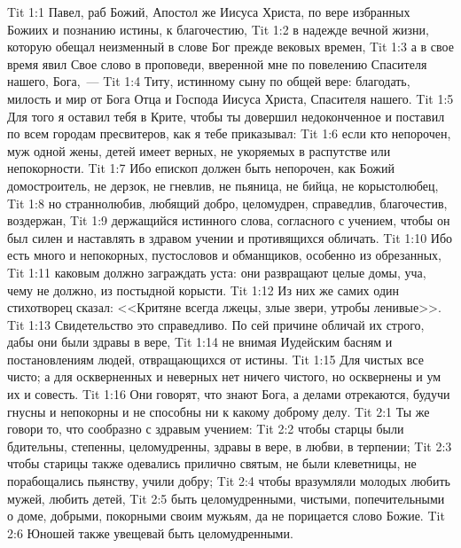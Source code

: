 \vs Tit 1:1 Павел, раб Божий, Апостол же Иисуса Христа, по вере избранных Божиих и познанию истины,  к благочестию,
\vs Tit 1:2 в надежде вечной жизни, которую обещал неизменный в слове Бог прежде вековых времен,
\vs Tit 1:3 а в свое время явил Свое слово в проповеди, вверенной мне по повелению Спасителя нашего, Бога,~---
\vs Tit 1:4 Титу, истинному сыну по общей вере: благодать, милость и мир от Бога Отца и Господа Иисуса Христа, Спасителя нашего.
\rsbpar\vs Tit 1:5 Для того я оставил тебя в Крите, чтобы ты довершил недоконченное и поставил по всем городам пресвитеров, как я тебе приказывал:
\vs Tit 1:6 если кто непорочен, муж одной жены, детей имеет верных, не укоряемых в распутстве или непокорности.
\vs Tit 1:7 Ибо епископ должен быть непорочен, как Божий домостроитель, не дерзок, не гневлив, не пьяница, не бийца, не корыстолюбец,
\vs Tit 1:8 но страннолюбив, любящий добро, целомудрен, справедлив, благочестив, воздержан,
\vs Tit 1:9 держащийся истинного слова, согласного с учением, чтобы он был силен и наставлять в здравом учении и противящихся обличать.
\rsbpar\vs Tit 1:10 Ибо есть много и непокорных, пустословов и обманщиков, особенно из обрезанных,
\vs Tit 1:11 каковым должно заграждать уста: они развращают целые домы, уча, чему не должно, из постыдной корысти.
\vs Tit 1:12 Из них же самих один стихотворец сказал: <<Критяне всегда лжецы, злые звери, утробы ленивые>>.
\vs Tit 1:13 Свидетельство это справедливо. По сей причине обличай их строго, дабы они были здравы в вере,
\vs Tit 1:14 не внимая Иудейским басням и постановлениям людей, отвращающихся от истины.
\vs Tit 1:15 Для чистых все чисто; а для оскверненных и неверных нет ничего чистого, но осквернены и ум их и совесть.
\vs Tit 1:16 Они говорят, что знают Бога, а делами отрекаются, будучи гнусны и непокорны и не способны ни к какому доброму делу.
\vs Tit 2:1 Ты же говори то, что сообразно с здравым учением:
\vs Tit 2:2 чтобы старцы были бдительны, степенны, целомудренны, здравы в вере, в любви, в терпении;
\vs Tit 2:3 чтобы старицы также одевались прилично святым, не были клеветницы, не порабощались пьянству, учили добру;
\vs Tit 2:4 чтобы вразумляли молодых любить мужей, любить детей,
\vs Tit 2:5 быть целомудренными, чистыми, попечительными о доме, добрыми, покорными своим мужьям, да не порицается слово Божие.
\vs Tit 2:6 Юношей также увещевай быть целомудренными.
